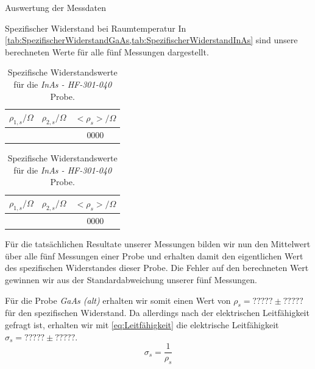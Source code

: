 \documentclass[pdftex, a4paper,11pt, twoside, ngerman]{report}
\begin{document}
\begin{chapter}{Auswertung der Messdaten}
\begin{section}{Spezifischer Widerstand bei Raumtemperatur}
      In \cref{tab:SpezifischerWiderstandGaAs,tab:SpezifischerWiderstandInAs}
      sind unsere berechneten Werte für alle fünf Messungen dargestellt.
      \begin{table}[htbp]
        \begin{minipage}{.48\textwidth}
          \centering
          \footnotesize
          \begin{tabular}{ccc}
            $\rho_{1,s}/\Omega$ & $\rho_{2,s}/\Omega$ & $<\rho_{s}>/\Omega$
            \\ \hline \hline
            
            \cline{3-3} \cline{3-3}
            & & $0000$ \\
          \end{tabular}
          \caption{Spezifische Widerstandswerte für die \textit{GaAs (alt)}
              Probe.}
          \label{tab:SpezifischerWiderstandGaAs}
        \end{minipage}\quad
        \begin{minipage}{.48\textwidth}
          \centering
          \footnotesize
          \begin{tabular}{ccc}
            $\rho_{1,s}/\Omega$ & $\rho_{2,s}/\Omega$ & $<\rho_{s}>/\Omega$
            \\ \hline \hline
            
            \cline{3-3} \cline{3-3}
            & & $0000$ \\
          \end{tabular}
          \caption{Spezifische Widerstandswerte für die
              \textit{InAs - HF-301-040} Probe.}
          \label{tab:SpezifischerWiderstandInAs}
        \end{minipage}
      \end{table}
      
      Für die tatsächlichen Resultate unserer Messungen bilden wir nun den
      Mittelwert über alle fünf Messungen einer Probe und erhalten damit
      den eigentlichen Wert des spezifischen Widerstandes dieser Probe.
      Die Fehler auf den berechneten Wert gewinnen wir aus der
      Standardabweichung unserer fünf Messungen.
      
      
      Für die Probe \textit{GaAs (alt)} erhalten wir somit einen Wert von
      $\rho_{s} = ????? \pm ?????$ für den spezifischen Widerstand.
      Da allerdings nach der elektrischen Leitfähigkeit gefragt ist, erhalten
      wir mit \cref{eq:Leitfähigkeit} die elektrische Leitfähigkeit
      $\sigma_{s} = ????? \pm ?????$.
      \begin{equation}
        \label{eq:Leitfähigkeit}
        \sigma_{s} = \frac{1}{\rho_{s}}
      \end{equation}
      

\end{section}
\end{chapter}
\end{document}

